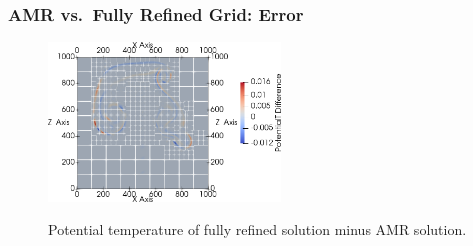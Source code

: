 \documentclass[aspectratio=169]{beamer}
\begin{document}
\begin{frame}
  \frametitle{AMR vs.\ Fully Refined Grid: Error}
  \begin{figure}[H]
     \centering
      {
\includegraphics[width=0.55\textwidth]{ppam_two_bubbles_amr_error}
   }
 \caption*{Potential temperature of fully refined solution minus AMR solution.}
   \end{figure}
\end{frame}
\end{document}
